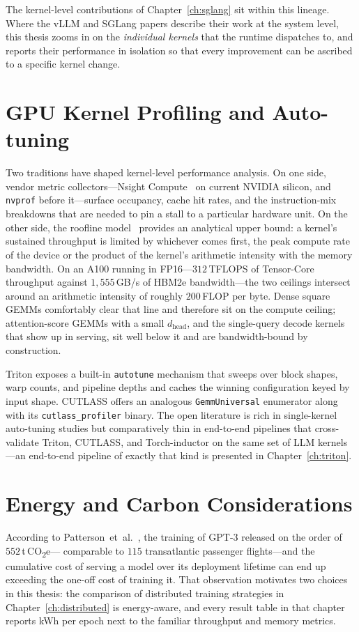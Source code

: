 The kernel-level contributions of Chapter~\ref{ch:sglang} sit within
this lineage. Where the vLLM and SGLang papers describe their work
at the system level, this thesis zooms in on the \emph{individual
kernels} that the runtime dispatches to, and reports their
performance in isolation so that every improvement can be ascribed
to a specific kernel change.

\section{GPU Kernel Profiling and Auto-tuning}\label{sec:lit_profiling}

Two traditions have shaped kernel-level performance analysis. On
one side, vendor metric collectors---Nsight
Compute~\cite{nsight} on current NVIDIA silicon, and \texttt{nvprof}
before it---surface occupancy, cache hit rates, and the
instruction-mix breakdowns that are needed to pin a stall to a
particular hardware unit. On the other side, the roofline
model~\cite{williams2009roofline} provides an analytical upper
bound: a kernel's sustained throughput is limited by whichever
comes first, the peak compute rate of the device or the product of
the kernel's arithmetic intensity with the memory bandwidth. On an
A100 running in FP16---$312$\,TFLOPS of Tensor-Core throughput
against $1{,}555$\,GB/s of HBM2e bandwidth---the two ceilings
intersect around an arithmetic intensity of roughly $200$\,FLOP per
byte. Dense square GEMMs comfortably clear that line and therefore
sit on the compute ceiling; attention-score GEMMs with a small
$d_{\text{head}}$, and the single-query decode kernels that show up
in serving, sit well below it and are bandwidth-bound by
construction.

Triton exposes a built-in \texttt{autotune} mechanism that sweeps
over block shapes, warp counts, and pipeline depths and caches the
winning configuration keyed by input shape. CUTLASS offers an
analogous \texttt{GemmUniversal} enumerator along with its
\texttt{cutlass\_profiler} binary. The open literature is rich in
single-kernel auto-tuning studies but comparatively thin in
end-to-end pipelines that cross-validate Triton, CUTLASS, and
Torch-inductor on the same set of LLM kernels---an
end-to-end pipeline of exactly that kind is presented in
Chapter~\ref{ch:triton}.

\section{Energy and Carbon Considerations}\label{sec:lit_energy}
According to
Patterson~et~al.~\cite{patterson2021carbon}, the training of GPT-3
released on the order of $552$\,t\,CO\textsubscript{2}e---
comparable to $115$ transatlantic passenger flights---and the
cumulative cost of serving a model over its deployment lifetime can
end up exceeding the one-off cost of training it. That observation
motivates two choices in this thesis: the comparison of distributed
training strategies in Chapter~\ref{ch:distributed} is energy-aware,
and every result table in that chapter reports kWh per epoch next
to the familiar throughput and memory metrics.


